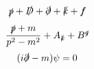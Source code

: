 \documentclass{article}
\begin{document}
\[\slashed{p}+\slashed{D}+\slashed{\partial}+\slashed{k}+\slashed{f}\]
\[\frac{\slashed{p}+m}{p^2-m^2}+A_{\slashed{k}}+B^{\slashed{q}}\]
\[(i\slashed{\partial}-m)\psi=0\]
\end{document}
